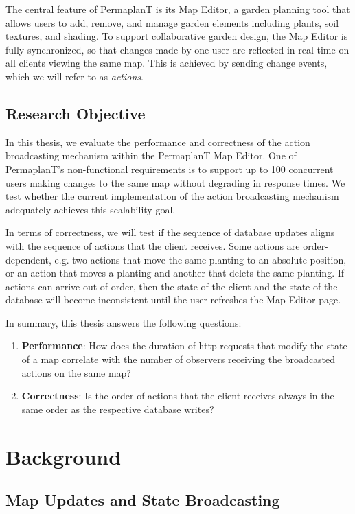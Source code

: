 \documentclass[final,oneside]{vutinfth}
\begin{document}
The central feature of PermaplanT is its Map Editor, a garden planning tool that allows users to add, remove, and manage garden elements including plants, soil textures, and shading.
To support collaborative garden design, the Map Editor is fully synchronized, so that changes made by one user are reflected in real time on all clients viewing the same map. This is achieved by sending change events, which we will refer to as \emph{actions}.

\section{Research Objective}

In this thesis, we evaluate the performance and correctness of the action broadcasting mechanism within the PermaplanT Map Editor.
One of PermaplanT's non-functional requirements is to support up to 100 concurrent users making changes to the same map without degrading in response times.
We test whether the current implementation of the action broadcasting mechanism adequately achieves this scalability goal.

In terms of correctness, we will test if the sequence of database updates aligns with the sequence of actions that the client receives.
Some actions are order-dependent, e.g. two actions that move the same planting to an absolute position, or an action that moves a planting and another that delets the same planting.
If actions can arrive out of order, then the state of the client and the state of the database will become inconsistent until the user refreshes the Map Editor page.

In summary, this thesis answers the following questions:
\begin{enumerate}
  \item \textbf{Performance}: How does the duration of \gls{http} requests that modify the state of a map correlate with the number of observers receiving the broadcasted actions on the same map?
  \item \textbf{Correctness}: Is the order of actions that the client receives always in the same order as the respective database writes? 
\end{enumerate}

\chapter{Background}

\section{Map Updates and State Broadcasting}
\end{document}
